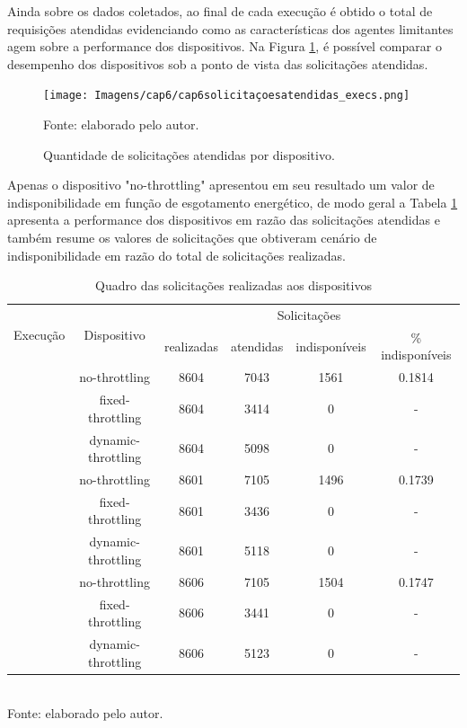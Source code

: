 	

Ainda sobre os dados coletados, ao final de cada execução é obtido o total de requisições atendidas evidenciando como as características dos agentes limitantes agem sobre a performance dos dispositivos. Na Figura \ref{fig:cap6solicitacoesatendidas}, é possível comparar o desempenho dos dispositivos sob a ponto de vista das solicitações atendidas.

\begin{figure}[H]
	\centering	
	\caption{Quantidade de solicitações atendidas por dispositivo.} 
	\label{fig:cap6solicitacoesatendidas}
	\noindent\texttt{[image: Imagens/cap6/cap6solicitaçoesatendidas\_execs.png]} 
	
	Fonte: elaborado pelo autor.
\end{figure}



Apenas o dispositivo "no-throttling" apresentou em seu resultado um valor de indisponibilidade em função de esgotamento energético, de modo geral a Tabela \ref{table:cap6:quadrogeralobtido} apresenta a performance dos dispositivos em razão das solicitações atendidas e também resume os valores de solicitações que obtiveram cenário de indisponibilidade em razão do total de solicitações realizadas.

\begingroup
\begin{table}[H]
	\centering
	\caption{Quadro das solicitações realizadas aos dispositivos}
	\begin{tabular}{|c|c|c|c|c|c|}
		\hline
		\multirow{2}{*}{Execução} & 
		\multirow{2}{*}{Dispositivo} &
		\multicolumn{4}{c|}{Solicitações}  \\\cline{3-6}\addlinespace[1pt]
		& & realizadas&  atendidas & indisponíveis  & \% indisponíveis \\
		\hline\addlinespace[1pt]
		\multirow{3}{*}{1} 	& no-throttling 	& 8604 &  7043	& 1561 	 	& 0.1814\\
							& fixed-throttling 	& 8604 &  3414	& 0 		& -\\
							& dynamic-throttling & 8604 & 5098 & 0 		&-\\
		\hdashline\addlinespace[1pt]
		\multirow{3}{*}{2}	& no-throttling 	& 8601 & 7105	& 1496  & 0.1739\\
							& fixed-throttling 	& 8601& 3436	& 0  & -\\
							& dynamic-throttling & 8601 & 5118	& 0  &-\\
		\hdashline\addlinespace[1pt]
	   \multirow{3}{*}{3}  & no-throttling & 8606 & 7105& 1504 &0.1747\\
	   	& fixed-throttling & 8606 &3441 & 0& -\\
	   	& dynamic-throttling & 8606 & 5123& 0&-\\
		\hline

	\end{tabular}
		\label{table:cap6:quadrogeralobtido}
		\\
		\footnotesize Fonte: elaborado pelo autor.
\end{table}
\endgroup

